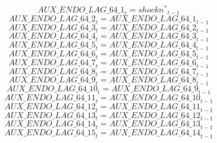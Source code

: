 \begin{dmath}
{AUX\_ENDO\_LAG\_64\_1}_{t}={{shockn^*}}_{t-1}
\end{dmath}
\begin{dmath}
{AUX\_ENDO\_LAG\_64\_2}_{t}={AUX\_ENDO\_LAG\_64\_1}_{t-1}
\end{dmath}
\begin{dmath}
{AUX\_ENDO\_LAG\_64\_3}_{t}={AUX\_ENDO\_LAG\_64\_2}_{t-1}
\end{dmath}
\begin{dmath}
{AUX\_ENDO\_LAG\_64\_4}_{t}={AUX\_ENDO\_LAG\_64\_3}_{t-1}
\end{dmath}
\begin{dmath}
{AUX\_ENDO\_LAG\_64\_5}_{t}={AUX\_ENDO\_LAG\_64\_4}_{t-1}
\end{dmath}
\begin{dmath}
{AUX\_ENDO\_LAG\_64\_6}_{t}={AUX\_ENDO\_LAG\_64\_5}_{t-1}
\end{dmath}
\begin{dmath}
{AUX\_ENDO\_LAG\_64\_7}_{t}={AUX\_ENDO\_LAG\_64\_6}_{t-1}
\end{dmath}
\begin{dmath}
{AUX\_ENDO\_LAG\_64\_8}_{t}={AUX\_ENDO\_LAG\_64\_7}_{t-1}
\end{dmath}
\begin{dmath}
{AUX\_ENDO\_LAG\_64\_9}_{t}={AUX\_ENDO\_LAG\_64\_8}_{t-1}
\end{dmath}
\begin{dmath}
{AUX\_ENDO\_LAG\_64\_10}_{t}={AUX\_ENDO\_LAG\_64\_9}_{t-1}
\end{dmath}
\begin{dmath}
{AUX\_ENDO\_LAG\_64\_11}_{t}={AUX\_ENDO\_LAG\_64\_10}_{t-1}
\end{dmath}
\begin{dmath}
{AUX\_ENDO\_LAG\_64\_12}_{t}={AUX\_ENDO\_LAG\_64\_11}_{t-1}
\end{dmath}
\begin{dmath}
{AUX\_ENDO\_LAG\_64\_13}_{t}={AUX\_ENDO\_LAG\_64\_12}_{t-1}
\end{dmath}
\begin{dmath}
{AUX\_ENDO\_LAG\_64\_14}_{t}={AUX\_ENDO\_LAG\_64\_13}_{t-1}
\end{dmath}
\begin{dmath}
{AUX\_ENDO\_LAG\_64\_15}_{t}={AUX\_ENDO\_LAG\_64\_14}_{t-1}
\end{dmath}
